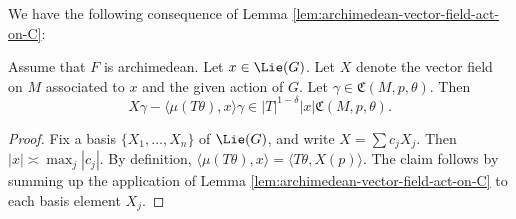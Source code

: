 We have the following consequence of Lemma \ref{lem:archimedean-vector-field-act-on-C}:
\begin{proposition}\label{lem:archimedean-vector-field-act-on-C-2}
  Assume that $F$ is archimedean.  Let $x \in \Lie(G)$.  Let $X$ denote the vector field on $M$ associated to $x$ and the given action of $G$.  Let $\gamma \in \mathfrak{C}(M,p,\theta)$.  Then
  \begin{equation*}
    X \gamma - \langle \mu(T \theta), x \rangle \gamma
    \in
    |T|^{1-\delta}    |x|    \mathfrak{C}(M,p,\theta).
  \end{equation*}
\end{proposition}
\begin{proof}
  Fix a basis $\{X_1,\dotsc,X_n\}$ of $\Lie(G)$, and write $X = \sum c_j X_j$.   Then $|x| \asymp \max_j |c_j|$.  By definition, $\langle \mu(T \theta), x \rangle = \langle T \theta, X(p) \rangle$.  The claim follows by summing up the application of Lemma \ref{lem:archimedean-vector-field-act-on-C} to each basis element $X_j$.
\end{proof}


